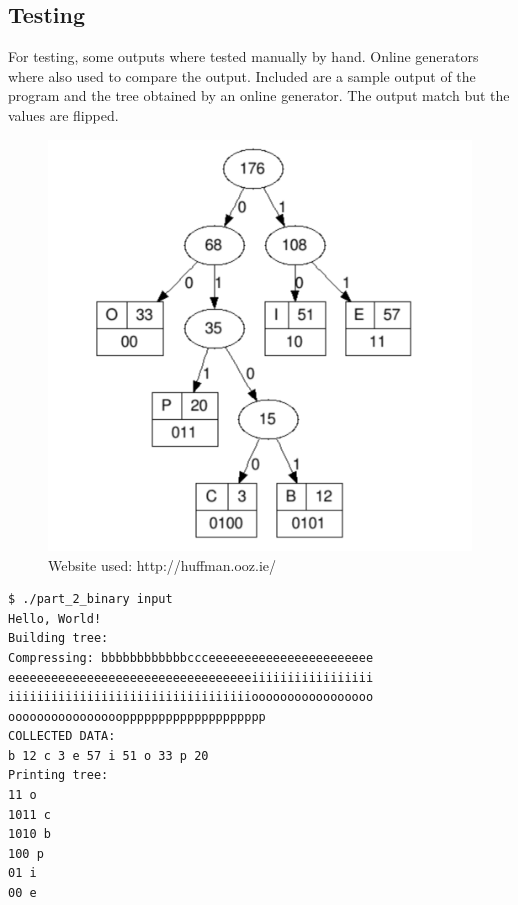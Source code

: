 \documentclass[a4paper, 12pt]{article}
\begin{document}
\subsection{Testing}
For testing, some outputs where tested manually by hand. Online generators where also used to compare the output. Included are
a sample output of the program and the tree obtained by an online generator. The output match but the values are flipped.


\begin{figure}
    \centering
    \includegraphics[width=1\textwidth]{huffman_1}
    \caption{Website used: http://huffman.ooz.ie/}
\end{figure}

\begin{lstlisting}[caption=Program output]
$ ./part_2_binary input
Hello, World!
Building tree:
Compressing: bbbbbbbbbbbbccceeeeeeeeeeeeeeeeeeeeeee
eeeeeeeeeeeeeeeeeeeeeeeeeeeeeeeeeeiiiiiiiiiiiiiiiii
iiiiiiiiiiiiiiiiiiiiiiiiiiiiiiiiiiooooooooooooooooo
oooooooooooooooopppppppppppppppppppp
COLLECTED DATA:
b 12 c 3 e 57 i 51 o 33 p 20
Printing tree:
11 o
1011 c
1010 b
100 p
01 i
00 e
\end{lstlisting}
\end{document}
